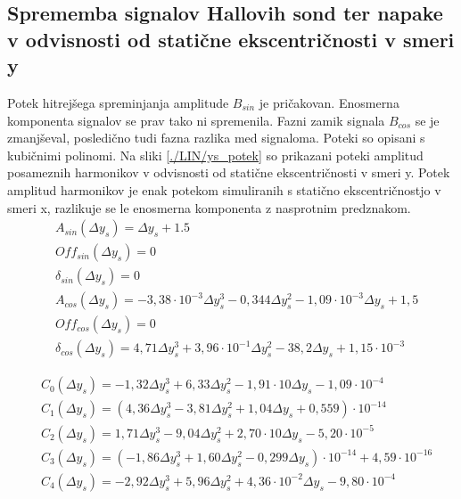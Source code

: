 \subsection{Sprememba signalov Hallovih sond ter napake v odvisnosti od statične ekscentričnosti v smeri y}

Potek hitrejšega spreminjanja amplitude $B_{sin}$ je pričakovan. Enosmerna komponenta signalov se prav tako ni spremenila. Fazni zamik signala $B_{cos}$ se je zmanjševal, posledično tudi fazna razlika med signaloma. Poteki so opisani s kubičnimi polinomi. Na sliki \ref{./LIN/ys_potek} so prikazani poteki amplitud posameznih harmonikov v odvisnosti od statične ekscentričnosti v smeri y.  Potek amplitud harmonikov je enak potekom simuliranih s statično ekscentričnostjo v smeri x, razlikuje se le enosmerna komponenta z nasprotnim predznakom.
\begin{eqnarray}
\label{analog_lin_ys}
&A_{sin}(\Delta y_s) = \Delta y_s+1.5\\
&Off_{sin}(\Delta y_s) = 0 \\
&\delta_{sin}(\Delta y_s) =0 \\
&A_{cos}(\Delta y_s) = -3,38\cdot 10^{-3} \Delta y_s^3-0,344\Delta y_s^2-1,09\cdot 10^{-3} \Delta y_s +1,5\\
&Off_{cos}(\Delta y_s) = 0 \\
&\delta_{cos}(\Delta y_s) = 4,71 \Delta y_s^3+3,96\cdot 10^{-1} \Delta y_s^2 - 38,2 \Delta y_s +1,15 \cdot 10^{-3}
\end{eqnarray}

\begin{eqnarray}
\label{nap_lin_ys}
&C_0(\Delta y_s) =-1,32\Delta y_s^{3}+6,33\Delta y_s^{2}-1,91\cdot 10\Delta y_s-1,09\cdot 10^{-4} \\                                   
&C_1(\Delta y_s) =(4,36\Delta y_s^{3}-3,81\Delta y_s^{2}+1,04\Delta y_s+0,559)\cdot 10^{-14} \\ 
&C_2 (\Delta y_s)=1,71\Delta y_s^{3}-9,04\Delta y_s^{2}+2,70\cdot 10\Delta y_s-5,20\cdot 10^{-5} \\                                    
&C_3(\Delta y_s) =(-1,86\Delta y_s^{3}+1,60\Delta y_s^{2}-0,299\Delta y_s)\cdot 10^{-14}+4,59\cdot 10^{-16} \\
&C_4(\Delta y_s) =-2,92\Delta y_s^{3}+5,96\Delta y_s^{2}+4,36\cdot 10^{-2}\Delta y_s-9,80\cdot 10^{-4}         
\end{eqnarray}

